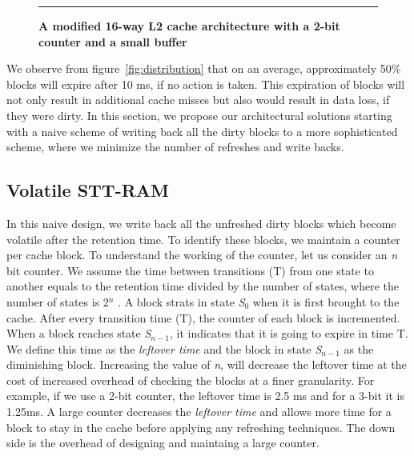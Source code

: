 
\begin{figure*} [t]
\center
 \hrule
 \caption{\label{fig:architecture} \scriptsize \bf A modified 16-way L2 cache architecture with a 2-bit counter and a small buffer}
\end{figure*}


We observe from figure~\ref{fig:distribution} that on an average, approximately 50\% blocks will 
expire after 10 ms, if no action is taken. This expiration of blocks will not only result in additional cache misses
but also would
result in data loss, if they were dirty. In this section, we propose our architectural solutions starting with
a naive scheme of writing back
all the dirty blocks to a more sophisticated scheme, where we minimize the number of refreshes and write backs. 

\subsection{{Volatile STT-RAM}}
In this naive design, we write back all the unfreshed dirty blocks which become volatile after the retention time.
To identify these blocks, 
we maintain a counter per cache block.  To understand the working of the counter, let us consider an {\it n} bit
counter. We assume the time between transitions (T) from one state to another equals to the retention time
divided by the number of states, where the number of states is 2$^n$ .
A block strats in state {\it S$_0$} when it is first brought to the cache. After every transition time (T),
the counter of each block is incremented.
When a block reaches  state {\it S$_{n-1}$}, it indicates that it is going to expire in time T. 
We define this time as the {\it leftover time} and the block in state {\it S$_{n-1}$} as  the diminishing block. 
Increasing the value of {\it n}, will decrease the leftover time at the cost of increased overhead of checking 
the blocks at a finer granularity. 
For example, if we use a 2-bit counter, the leftover time is 2.5 ms and for a 3-bit it is 1.25ms.
A large counter decreases the {\it leftover time} and allows more time for a block to stay in the cache
before applying any refreshing techniques. The down side is the overhead of designing and maintaing a large counter. 

